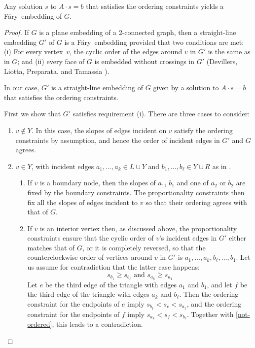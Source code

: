 \documentclass{patmorin}
\newcommand{\Fary}{Fáry}
\begin{document}
\begin{lem}
   Any solution $s$ to $A\cdot s=b$ that satisfies
 the ordering constraints %
 yields a
   \Fary\ embedding of $G$.
\end{lem}

\begin{proof}
   If $G$ is a plane embedding of a 2-connected graph, then a
   straight-line embedding $G'$ of $G$ is a \Fary\ embedding provided
   that two conditions are met:
(i) For every vertex~$v$, the cyclic order of the
   edges around $v$ in $G'$ is the same as in $G$; and
(ii) every face of $G$ is embedded without crossings in $G'$
(Devillers, Liotta, Preparata, and Tamassia \cite[Lemma~16]{devillers.liotta.ea:checking}).

In our case, $G'$ is a straight-line embedding of $G$ given by a solution
to $A\cdot s = b$ that satisfies the ordering constraints.  


First we show that $G'$ satisfies requirement (i). There are three cases to consider:
\begin{enumerate}
\item $v\not\in Y$. In this case, the slopes of edges incident on $v$
satisfy the ordering constraints by assumption, and hence the order of
incident edges in $G'$ and $G$ agrees.

\item
$v\in Y$, with incident edges $a_1,\ldots,a_k\in
L\cup Y$ and $b_1,\ldots,b_\ell\in Y\cup R$ as in . 
\begin{enumerate}
\item If
$v$ is a boundary node, then the slopes of $a_1$, $b_1$ and one of
$a_2$ or $b_2$ are fixed by the boundary constraints.  The proportionality
constraints then fix all the slopes of edges incident to $v$ so that
their ordering agrees with that of $G$.

\item If $v$ is an interior vertex then, 
 as discussed above, the proportionality constraints ensure that
the cyclic order of $v$'s incident edges in $G'$ either matches that of $G$, or it is completely reversed, so that the counterclockwise order of vertices around $v$ in $G'$ is $a_1,\ldots,a_k,b_\ell,\ldots,b_1$.
Let us assume for contradiction that the latter case happens:
\begin{equation}
  \label{eq:not-ordered}
s_{b_1}\ge s_{b_\ell}
\text{ and }
s_{a_k}\ge s_{a_1}
\end{equation}
Let $e$ be the third edge of the triangle with edges $a_1$ and $b_1$,
and let 
 $f$ be the third edge of the triangle with edges $a_k$ and $b_\ell$.
Then the ordering constraint for the endpoints of $e$ imply
\begin{math}
  s_{b_1}<s_e<s_{a_1}
\end{math},
and the ordering constraint for the endpoints of $f$ imply
\begin{math}
  s_{a_k}<s_f<s_{b_\ell}
\end{math}.
Together with \eqref{not-ordered}, this leads to a contradiction.
\end{enumerate}
\end{enumerate}


\end{proof}
\end{document}
